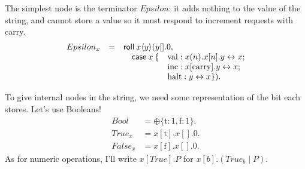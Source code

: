 \documentclass[envcountsame]{llncs}
\newcommand{\mkwd}[1]{\mathsf{#1}}
\newcommand{\link}[2]{#1 \leftrightarrow #2}
\newcommand{\clabel}[1]{\mathrm{#1}}
\newcommand{\sel}[2]{#1[\clabel{#2}]}
\begin{document}
The simplest node is the terminator $Epsilon$: it adds nothing to the value of the string, and
cannot store a value so it must respond to increment requests with carry.
%
{\small\[\begin{array}{rcll}
  Epsilon_x & = & \multicolumn{2}{l}{\mkwd{roll}\:x\langle y \rangle ( y[].0,} \\
  & & \quad \mkwd{case}\:x\: \{ &\clabel{val}: x(n).x[n].\link{y}{x}; \\
  & & &\clabel{inc}:\sel{x}{carry}.\link{y}{x}; \\
  & & &\clabel{halt}: \link{y}{x} \}).
\end{array}\]}

To give internal nodes in the string, we need some representation of the bit each stores.  Let's use
Booleans!
%
{\small\begin{align*}
Bool &= \oplus \{ \clabel{t}:1, \clabel{f}:1 \}. \\
True_x &= \sel{x}{t}.x[].0. \\
False_x &= \sel{x}{f}.x[].0.
\end{align*}}
%
As for numeric operations, I'll write $x[True].P$ for $x[b].(True_b \mid P)$.
\end{document}
